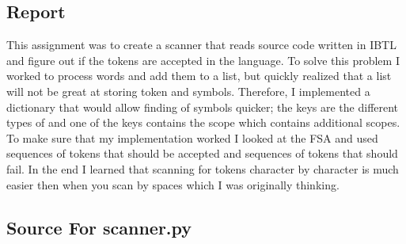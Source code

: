 \documentclass[letterpaper,10pt]{article}
\begin{document}
\subsection{Report}

\begin{mdframed}[style=MyFrame]
This assignment was to create a scanner that reads source code written in IBTL and figure out if the tokens are accepted in the language. To solve this problem I worked to process words and add them to a list, but quickly realized that a list will not be great at storing token and symbols. Therefore, I implemented a dictionary that would allow finding of symbols quicker; the keys are the different types of and one of the keys contains the scope which contains additional scopes. To make sure that my implementation worked I looked at the FSA and used sequences of tokens that should be accepted and sequences of tokens that should fail. In the end I learned that scanning for tokens character by character is much easier then when you scan by spaces which I was originally thinking. 
\end{mdframed}



\newpage
\subsection{Source For scanner.py}

\end{document}
